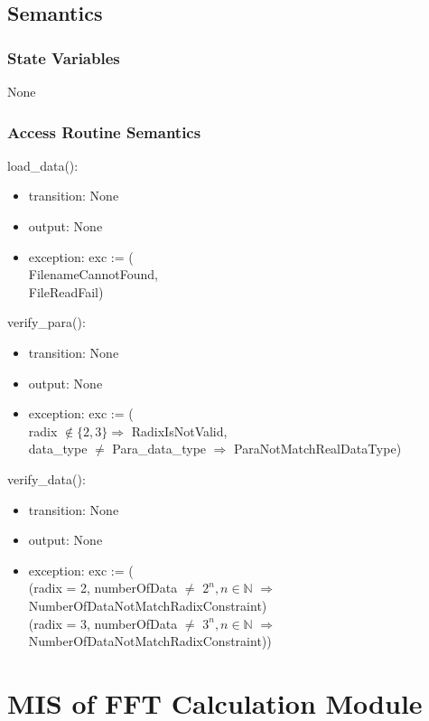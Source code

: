\documentclass[12pt, titlepage]{article}
\begin{document}
\subsection{Semantics}

\subsubsection{State Variables}
None

\subsubsection{Access Routine Semantics}

load\_data():

\begin{itemize}
\item transition: None
\item output:  None
\item exception: exc := (\\
FilenameCannotFound,\\
 FileReadFail)
\end{itemize}
verify\_para():
\begin{itemize}
\item transition: None
\item output:  None
\item exception: exc := (\\
radix $\not\in \{2, 3\} \Rightarrow$ RadixIsNotValid,\\
data\_type $\neq$ Para\_data\_type $\Rightarrow $ ParaNotMatchRealDataType)
\end{itemize}
verify\_data():
\begin{itemize}
\item transition: None
\item output:  None
\item exception: exc := (\\
(radix = 2, numberOfData $\neq$ $2^n, n\in \mathbb{N}$ $\Rightarrow$ NumberOfDataNotMatchRadixConstraint)\\
(radix = 3, numberOfData $\neq$ $3^n, n\in \mathbb{N}$ $\Rightarrow$ NumberOfDataNotMatchRadixConstraint))
\end{itemize}


\section{MIS of FFT Calculation Module} \label{Input} 
\end{document}
